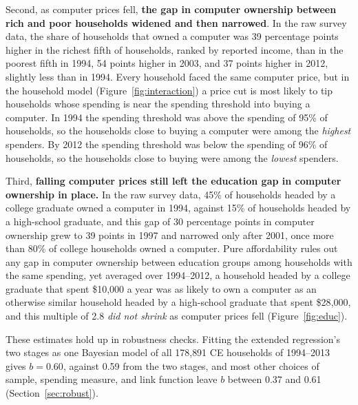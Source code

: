 \documentclass[11pt]{article}
\begin{document}
Second, as computer prices fell, \textbf{the gap in computer ownership between rich and poor households widened and then narrowed}. In the raw survey data, the share of households that owned a computer was 39 percentage points higher in the richest fifth of households, ranked by reported income, than in the poorest fifth in 1994, 54 points higher in 2003, and 37 points higher in 2012, slightly less than in 1994. Every household faced the same computer price, but in the household model (Figure~\ref{fig:interaction}) a price cut is most likely to tip households whose spending is near the spending threshold into buying a computer. In 1994 the spending threshold was above the spending of 95\% of households, so the households close to buying a computer were among the \emph{highest} spenders. By 2012 the spending threshold was below the spending of 96\% of households, so the households close to buying were among the \emph{lowest} spenders.

Third, \textbf{falling computer prices still left the education gap in computer ownership in place.} In the raw survey data, 45\% of households headed by a college graduate owned a computer in 1994, against 15\% of households headed by a high-school graduate, and this gap of 30 percentage points in computer ownership grew to 39 points in 1997 and narrowed only after 2001, once more than 80\% of college households owned a computer. Pure affordability rules out any gap in computer ownership between education groups among households with the same spending, yet averaged over 1994--2012, a household headed by a college graduate that spent \$10{,}000 a year was as likely to own a computer as an otherwise similar household headed by a high-school graduate that spent \$28{,}000, and this multiple of 2.8 \emph{did not shrink} as computer prices fell (Figure~\ref{fig:educ}).

These estimates hold up in robustness checks. Fitting the extended regression's two stages as one Bayesian model of all 178{,}891 CE households of 1994--2013 gives $b = 0.60$, against 0.59 from the two stages, and most other choices of sample, spending measure, and link function leave $b$ between 0.37 and 0.61 (Section~\ref{sec:robust}).
\end{document}
